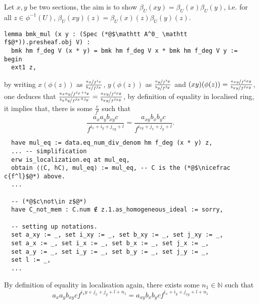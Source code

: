 \documentclass[a4paper,UKenglish,cleveref, autoref, thm-restate]{lipics-v2021}
\begin{document}
Let $x, y$ be two sections, the aim is to show $\beta_U(xy)=\beta_U(x)\beta_U(y)$, i.e. for all $z\in\phi^{-1}(U)$, $\beta_U(xy)(z)=\beta_U(x)(z)\beta_U(y)(z)$.
\begin{lstlisting}
lemma bmk_mul (x y : (Spec (*@$\mathtt A^0_ \mathtt f$@*)).presheaf.obj V) :
  bmk hm f_deg V (x * y) = bmk hm f_deg V x * bmk hm f_deg V y :=
begin
  ext1 z,
\end{lstlisting}
by writing $x(\phi(z))$ as $\frac{\nicefrac{a_x}{f^{i_x}}}{\nicefrac{b_x}{f^{j_x}}}$, $y(\phi(z))$ as $\frac{\nicefrac{a_y}{f^{i_y}}}{\nicefrac{b_y}{f^{j_y}}}$ and $(xy)(\phi(z))=\frac{\nicefrac{a_{xy}}{f^{i_{xy}}}}{\nicefrac{b_{xy}}{f^{j_{xy}}}}$, one deduces that $\frac{\nicefrac{a_xa_y}{f^{i_x+i_y}}}{\nicefrac{b_xb_y}{f^{j_x+j_y}}}=\frac{\nicefrac{a_{xy}}{f^{i_{xy}}}}{\nicefrac{b_{xy}}{f^{j_{xy}}}}$, by definition of equality in localised ring, it implies that, there is some $\frac{c}{f^l}$ such that $$\frac{a_xa_yb_{xy}c}{f^{i_x+i_y+j_{xy}+l}}=\frac{a_{xy}b_xb_yc}{f^{i_{xy}+j_x+j_y+l}}.$$
\begin{lstlisting}
  have mul_eq := data.eq_num_div_denom hm f_deg (x * y) z,
  ... -- simplification
  erw is_localization.eq at mul_eq,
  obtain ⟨⟨C, hC⟩, mul_eq⟩ := mul_eq, -- C is the (*@$\nicefrac c{f^l}$@*) above.
  ...
  
  -- (*@$c\not\in z$@*)
  have C_not_mem : C.num ∉ z.1.as_homogeneous_ideal := sorry,

  -- setting up notations.
  set a_xy := _, set i_xy := _, set b_xy := _, set j_xy := _,
  set a_x := _, set i_x := _, set b_x := _, set j_x := _,
  set a_y := _, set i_y := _, set b_y := _, set j_y := _,
  set l := _,
  ...
\end{lstlisting}
By definition of equality in localisation again, there exists some $n_1\in \mathbb{N}$ such that
\begin{equation}\label{eqn:example-intermediate}
  a_xa_yb_{xy} c f^{i_xy+j_x+j_y+l+n_1} = a_{xy}b_xb_y c f^{i_x+i_y+j_{xy}+l+n_1}  
\end{equation}
\end{document}
